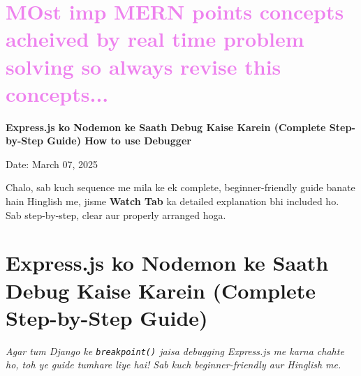 \documentclass[a4paper,12pt]{article}
\begin{document}
\section*{\textbf{\LARGE \textcolor{violet}{MOst imp MERN points concepts acheived by real time problem solving so always revise this concepts...}}}

\newpage

\begin{titlepage}
    \centering
    \vspace*{3cm}
    {\Huge\bfseries\color{myblue} Express.js ko Nodemon ke Saath Debug Kaise Karein (Complete Step-by-Step Guide) How to use Debugger \par}
    \vspace{1cm}
    {\large Date: March 07, 2025\par}
    \vfill
\end{titlepage}

\hrulefill

Chalo, sab kuch sequence me mila ke ek complete, beginner-friendly guide banate hain Hinglish me, jisme \textbf{\color{myblue}Watch Tab} ka detailed explanation bhi included ho. Sab step-by-step, clear aur properly arranged hoga.

\section{Express.js ko Nodemon ke Saath Debug Kaise Karein (Complete Step-by-Step Guide)}
\textit{Agar tum Django ke \texttt{\color{mygreen}breakpoint()} jaisa debugging Express.js me karna chahte ho, toh ye guide tumhare liye hai! Sab kuch beginner-friendly aur Hinglish me.}

\end{document}
